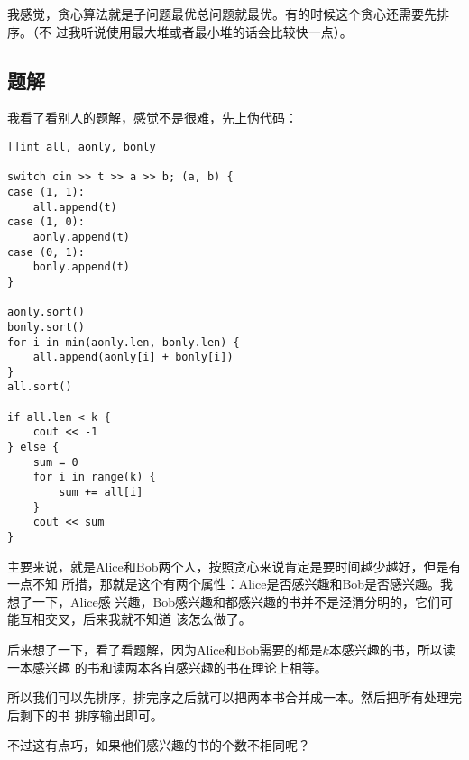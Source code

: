 
我感觉，贪心算法就是子问题最优总问题就最优。有的时候这个贪心还需要先排序。（不
过我听说使用最大堆或者最小堆的话会比较快一点）。

\subsection{题解}

我看了看别人的题解，感觉不是很难，先上伪代码：
\begin{lstlisting}
[]int all, aonly, bonly

switch cin >> t >> a >> b; (a, b) {
case (1, 1):
    all.append(t)
case (1, 0):
    aonly.append(t)
case (0, 1):
    bonly.append(t)
}

aonly.sort()
bonly.sort()
for i in min(aonly.len, bonly.len) {
    all.append(aonly[i] + bonly[i])
}
all.sort()

if all.len < k {
    cout << -1
} else {
    sum = 0
    for i in range(k) {
        sum += all[i]
    }
    cout << sum
}
\end{lstlisting}

主要来说，就是Alice和Bob两个人，按照贪心来说肯定是要时间越少越好，但是有一点不知
所措，那就是这个有两个属性：Alice是否感兴趣和Bob是否感兴趣。我想了一下，Alice感
兴趣，Bob感兴趣和都感兴趣的书并不是泾渭分明的，它们可能互相交叉，后来我就不知道
该怎么做了。

后来想了一下，看了看题解，因为Alice和Bob需要的都是$k$本感兴趣的书，所以读一本感兴趣
的书和读两本各自感兴趣的书在理论上相等。

所以我们可以先排序，排完序之后就可以把两本书合并成一本。然后把所有处理完后剩下的书
排序输出即可。

不过这有点巧，如果他们感兴趣的书的个数不相同呢？

